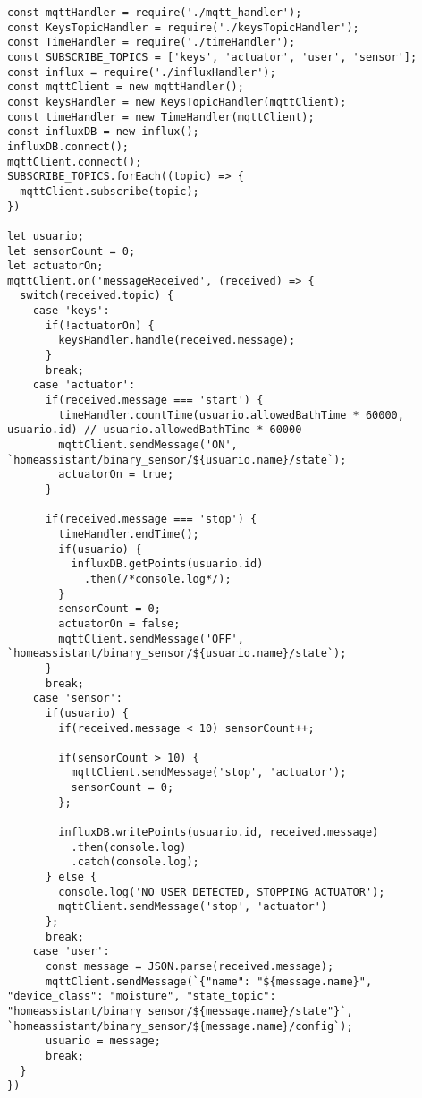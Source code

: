 \begin{lstlisting}[caption= Código principal do sistema]
const mqttHandler = require('./mqtt_handler');
const KeysTopicHandler = require('./keysTopicHandler');
const TimeHandler = require('./timeHandler');
const SUBSCRIBE_TOPICS = ['keys', 'actuator', 'user', 'sensor'];
const influx = require('./influxHandler');
const mqttClient = new mqttHandler();
const keysHandler = new KeysTopicHandler(mqttClient);
const timeHandler = new TimeHandler(mqttClient);
const influxDB = new influx();
influxDB.connect();
mqttClient.connect();
SUBSCRIBE_TOPICS.forEach((topic) => {
  mqttClient.subscribe(topic);
})

let usuario;
let sensorCount = 0;
let actuatorOn;
mqttClient.on('messageReceived', (received) => {
  switch(received.topic) {
    case 'keys':
      if(!actuatorOn) {
        keysHandler.handle(received.message);
      }
      break;
    case 'actuator':
      if(received.message === 'start') {
        timeHandler.countTime(usuario.allowedBathTime * 60000, usuario.id) // usuario.allowedBathTime * 60000
        mqttClient.sendMessage('ON', `homeassistant/binary_sensor/${usuario.name}/state`);
        actuatorOn = true;
      }

      if(received.message === 'stop') {
        timeHandler.endTime();
        if(usuario) {
          influxDB.getPoints(usuario.id)
            .then(/*console.log*/);
        }
        sensorCount = 0;
        actuatorOn = false;
        mqttClient.sendMessage('OFF', `homeassistant/binary_sensor/${usuario.name}/state`);
      }
      break;
    case 'sensor':
      if(usuario) {
        if(received.message < 10) sensorCount++;
  
        if(sensorCount > 10) {
          mqttClient.sendMessage('stop', 'actuator');
          sensorCount = 0;
        };
  
        influxDB.writePoints(usuario.id, received.message)
          .then(console.log)
          .catch(console.log);
      } else {
        console.log('NO USER DETECTED, STOPPING ACTUATOR');
        mqttClient.sendMessage('stop', 'actuator')
      };
      break;
    case 'user':
      const message = JSON.parse(received.message);
      mqttClient.sendMessage(`{"name": "${message.name}", "device_class": "moisture", "state_topic": "homeassistant/binary_sensor/${message.name}/state"}`, `homeassistant/binary_sensor/${message.name}/config`);
      usuario = message;
      break;
  }
})
\end{lstlisting}

